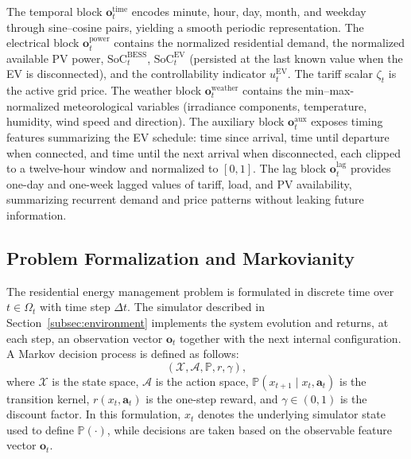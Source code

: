 \documentclass[preprint,12pt, 3p]{elsarticle}
\begin{document}
The temporal block $\mathbf{o}_t^{\text{time}}$ encodes minute, hour, day, month, and weekday through sine--cosine pairs, yielding a smooth periodic representation. The electrical block $\mathbf{o}_t^{\text{power}}$ contains the normalized residential demand, the normalized available \gls{PV} power, $\text{SoC}_t^{\text{BESS}}$, $\text{SoC}_t^{\text{EV}}$ (persisted at the last known value when the \gls{EV} is disconnected), and the controllability indicator $u_t^{\text{EV}}$. The tariff scalar $\zeta_t$ is the active grid price. The weather block $\mathbf{o}_t^{\text{weather}}$ contains the min--max-normalized meteorological variables (irradiance components, temperature, humidity, wind speed and direction). The auxiliary block $\mathbf{o}_t^{\text{aux}}$ exposes timing features summarizing the \gls{EV} schedule: time since arrival, time until departure when connected, and time until the next arrival when disconnected, each clipped to a twelve-hour window and normalized to $[0,1]$. The lag block $\mathbf{o}_t^{\text{lag}}$ provides one-day and one-week lagged values of tariff, load, and \gls{PV} availability, summarizing recurrent demand and price patterns without leaking future information.


\subsection{Problem Formalization and Markovianity}
\label{subsec:problem_formalization}
\label{subsec:mdp_formalization}

The residential energy management problem is formulated in discrete time over $t \in \Omega_t$ with time step $\Delta t$. The simulator described in Section~\ref{subsec:environment} implements the system evolution and returns, at each step, an observation vector $\mathbf{o}_t$ together with the next internal configuration. A Markov decision process is defined as follows:
\begin{equation}
\label{eq:mdp_tuple}
\left(\mathcal{X},\mathcal{A},\mathbb{P},r,\gamma\right),
\end{equation}
where $\mathcal{X}$ is the state space, $\mathcal{A}$ is the action space, $\mathbb{P}(x_{t+1}\mid x_t,\mathbf{a}_t)$ is the transition kernel, $r(x_t,\mathbf{a}_t)$ is the one-step reward, and $\gamma \in (0,1)$ is the discount factor. In this formulation, $x_t$ denotes the underlying simulator state used to define $\mathbb{P}(\cdot)$, while decisions are taken based on the observable feature vector $\mathbf{o}_t$.
\end{document}
